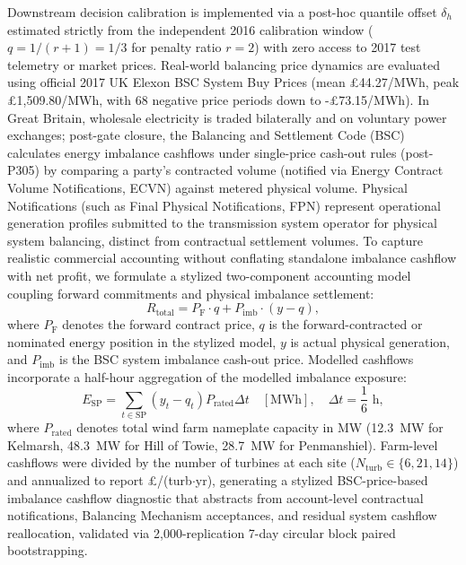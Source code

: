 Downstream decision calibration is implemented via a post-hoc quantile offset $\delta_h$ estimated strictly from the independent 2016 calibration window ($q = 1/(r+1) = 1/3$ for penalty ratio $r=2$) with zero access to 2017 test telemetry or market prices. Real-world balancing price dynamics are evaluated using official 2017 UK Elexon BSC System Buy Prices (mean \pounds 44.27/MWh, peak \pounds 1,509.80/MWh, with 68 negative price periods down to -\pounds 73.15/MWh). In Great Britain, wholesale electricity is traded bilaterally and on voluntary power exchanges; post-gate closure, the Balancing and Settlement Code (BSC) calculates energy imbalance cashflows under single-price cash-out rules (post-P305) by comparing a party's contracted volume (notified via Energy Contract Volume Notifications, ECVN) against metered physical volume. Physical Notifications (such as Final Physical Notifications, FPN) represent operational generation profiles submitted to the transmission system operator for physical system balancing, distinct from contractual settlement volumes. To capture realistic commercial accounting without conflating standalone imbalance cashflow with net profit, we formulate a stylized two-component accounting model \cite{pinson2007trading} coupling forward commitments and physical imbalance settlement:
\begin{equation}
R_{\text{total}} = P_{\text{F}} \cdot q + P_{\text{imb}} \cdot (y - q),
\label{eq:two_settlement}
\end{equation}
where $P_{\text{F}}$ denotes the forward contract price, $q$ is the forward-contracted or nominated energy position in the stylized model, $y$ is actual physical generation, and $P_{\text{imb}}$ is the BSC system imbalance cash-out price. Modelled cashflows incorporate a half-hour aggregation of the modelled imbalance exposure:
\begin{equation}
E_{\text{SP}} = \sum_{t \in \text{SP}} (y_t - q_t) P_{\text{rated}} \Delta t \quad [\text{MWh}], \quad \Delta t = \frac{1}{6}\text{ h},
\label{eq:bsc_netting}
\end{equation}
where $P_{\text{rated}}$ denotes total wind farm nameplate capacity in MW (12.3~MW for Kelmarsh, 48.3~MW for Hill of Towie, 28.7~MW for Penmanshiel). Farm-level cashflows were divided by the number of turbines at each site ($N_{\text{turb}} \in \{6, 21, 14\}$) and annualized to report \pounds/(turb$\cdot$yr), generating a stylized BSC-price-based imbalance cashflow diagnostic that abstracts from account-level contractual notifications, Balancing Mechanism acceptances, and residual system cashflow reallocation, validated via 2,000-replication 7-day circular block paired bootstrapping.
